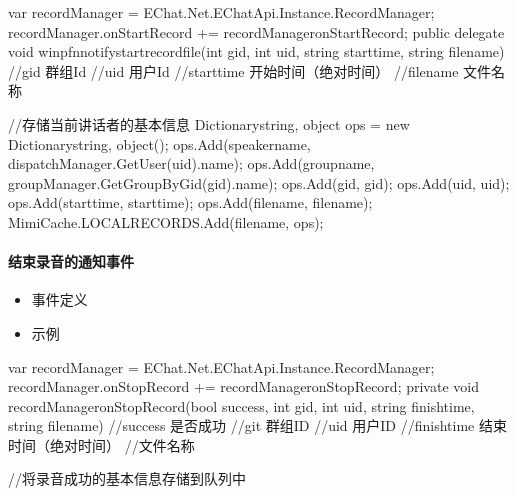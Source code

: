 \documentclass[letterpaper,10pt,english]{sphinxmanual}
\begin{document}
%
\begin{sphinxVerbatim}[commandchars=\\\{\}]
var \PYGZus{}recordManager = EChat.Net.EChatApi.Instance.RecordManager;
\PYGZus{}recordManager.onStartRecord += \PYGZus{}recordManager\PYGZus{}onStartRecord;
public delegate void win\PYGZus{}pfn\PYGZus{}notify\PYGZus{}start\PYGZus{}recordfile(int gid, int uid, string starttime, string filename)
\PYGZob{}
  //gid       群组Id
  //uid       用户Id
  //starttime 开始时间（绝对时间）
  //filename  文件名称

  //存储当前讲话者的基本信息
  Dictionary\PYGZlt{}string, object\PYGZgt{} ops = new Dictionary\PYGZlt{}string, object\PYGZgt{}();
  ops.Add(\PYGZdq{}speakername\PYGZdq{}, dispatchManager.GetUser(uid).name);
  ops.Add(\PYGZdq{}groupname\PYGZdq{}, groupManager.GetGroupByGid(gid).name);
  ops.Add(\PYGZdq{}gid\PYGZdq{}, gid);
  ops.Add(\PYGZdq{}uid\PYGZdq{}, uid);
  ops.Add(\PYGZdq{}starttime\PYGZdq{}, starttime);
  ops.Add(\PYGZdq{}filename\PYGZdq{}, filename);
  MimiCache.LOCAL\PYGZus{}RECORDS.Add(filename, ops);
\PYGZcb{}
\end{sphinxVerbatim}


\paragraph{结束录音的通知事件}
\label{\detokenize{csharp:id83}}\begin{itemize}
\item {} 
事件定义

\end{itemize}

%
\begin{sphinxVerbatim}[commandchars=\\\{\}]
   
\end{sphinxVerbatim}
\begin{itemize}
\item {} 
示例

\end{itemize}

%
\begin{sphinxVerbatim}[commandchars=\\\{\}]
var \PYGZus{}recordManager = EChat.Net.EChatApi.Instance.RecordManager;
\PYGZus{}recordManager.onStopRecord += \PYGZus{}recordManager\PYGZus{}onStopRecord;
private void \PYGZus{}recordManager\PYGZus{}onStopRecord(bool success, int gid, int uid, string finishtime, string filename)
\PYGZob{}
  //success 是否成功
  //git     群组ID
  //uid     用户ID
  //finishtime 结束时间（绝对时间）
  //文件名称

  //将录音成功的基本信息存储到队列中
\PYGZcb{}
\end{sphinxVerbatim}
\end{document}
